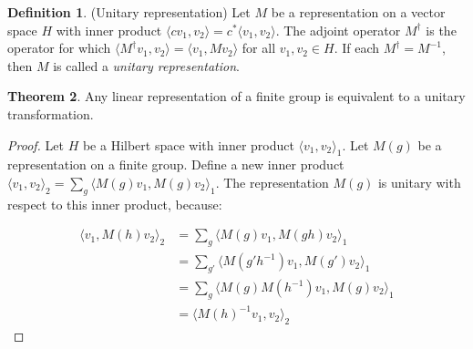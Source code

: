 \documentclass[12pt, letterpaper]{article}
\theoremstyle{definition} %
\newtheorem{thm}{Theorem}[section] %
\newtheorem{defn}[thm]{Definition} %
\begin{document}
\begin{defn} (Unitary representation)
  Let $M$ be a representation on a vector space $H$ with inner product $\langle cv_1,v_2\rangle=c^*\langle v_1,v_2\rangle$. The
  adjoint operator $M^\dagger$ is the operator for which $\langle M^\dagger v_1,v_2\rangle=\langle v_1,Mv_2\rangle$ for all $v_1,v_2\in H$. 
  If each $M^\dagger=M^{-1}$, then $M$ is called a \emph{unitary representation}.
\end{defn}

\begin{thm}
  \label{unitaryrep}
  Any linear representation of a finite group is equivalent to a unitary transformation.
\end{thm}
\begin{proof}
  Let $H$ be a Hilbert space with inner product $\langle v_1,v_2\rangle_1$. Let $M(g)$ be a representation on a finite group. 
  Define a new inner product $\langle v_1,v_2\rangle_2=\sum_g\langle M(g)v_1,M(g)v_2\rangle_1$. The representation $M(g)$ is 
  unitary with respect to this inner product, because: 
  
  \begin{align*}
    \langle v_1,M(h)v_2\rangle_2&=\sum_g\langle M(g)v_1,M(gh)v_2\rangle_1\\
    &=\sum_{g'}\langle M(g' h^{-1})v_1,M(g')v_2\rangle_1\\
  &=\sum_{g}\langle M(g)M(h^{-1})v_1,M(g)v_2\rangle_1\\
  &=\langle M(h)^{-1}v_1,v_2\rangle_2
  \end{align*}
\end{proof}
\end{document}
